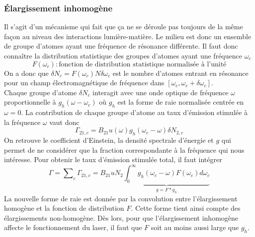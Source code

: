 	 \subsubsection{Élargissement inhomogène}
	 Il s'agit d'un mécanisme qui fait que ça ne se déroule pas toujours de la même façon au 
	 niveau des interactions lumière-matière. Le milieu est donc un ensemble de groupe d'atomes
	 ayant une fréquence de résonance différente. Il faut donc connaître la distribution statistique
	 des groupes d'atomes ayant une fréquence $\omega_c$
	 \begin{equation}
	 F(\omega_c) : \text{fonction de distribution statistique normalisée à l'unité}
	 \end{equation}
	 On a donc que $\delta N_c = F(\omega_c)N\delta\omega_c$ est le nombre d'atomes entrant en 
	 résonance pour un champ électromagnétique de fréquence dans $[\omega_c,\omega_c+\delta
	 \omega_c]$.\\
	 
	 Chaque groupe d'atome $\delta N_c$ interagit avec une onde optique de fréquence $\omega$ 
	 proportionnelle à $g_h(\omega-\omega_c)$ où $g_h$ est la forme de raie normalisée centrée 
	 en $\omega=0$. La contribution de chaque groupe d'atome au taux d'émission stimulée à la 
	 fréquence $\omega$ vaut donc
	 \begin{equation}
	 {\Gamma _{21,c}} = {B_{21}}u(\omega ){g_h}({\omega _c} - \omega )\delta {N_{2,c}}
	 \end{equation}
	 On retrouve le coefficient d'Einstein, la densité spectrale d'énergie et $g$ qui permet de 
	 ne considérer que la fraction correspondante à la fréquence qui nous intéresse. Pour obtenir 
	 le taux d'émission stimulée total, il faut intégrer
	 \begin{equation}
	 \Gamma  = \sum\nolimits_c {{\Gamma _{21,c}}}  = {B_{21}}u{N_2}\underbrace{\int_0^\infty  {{g_h}({\omega _c} - \omega )F({\omega _c})d{\omega _c}} }_{g = F*g_h}
	 \end{equation}
	 La nouvelle forme de raie est donnée par la convolution entre l'élargissement homogène et
	 la fonction de distribution $F$. Cette forme tient ainsi compte des élargissements 
	 non-homogène. Dès lors, pour que l'élargissement inhomogène affecte le fonctionnement du 
	 laser, il faut que $F$ soit au moins aussi large que $g_h$.\\


